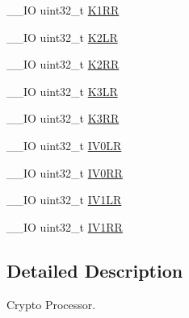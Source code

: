 \begin{DoxyCompactItemize}
\item 
\-\_\-\-\_\-\-I\-O uint32\-\_\-t \hyperlink{struct_c_r_y_p___type_def_a7554383cff84540eb260a3fdf55cb934}{K1\-R\-R}
\item 
\-\_\-\-\_\-\-I\-O uint32\-\_\-t \hyperlink{struct_c_r_y_p___type_def_a32210fb9ecbb0b4bd127e688f3f79802}{K2\-L\-R}
\item 
\-\_\-\-\_\-\-I\-O uint32\-\_\-t \hyperlink{struct_c_r_y_p___type_def_a41a0448734e8ccbdd6fba98284815c6f}{K2\-R\-R}
\item 
\-\_\-\-\_\-\-I\-O uint32\-\_\-t \hyperlink{struct_c_r_y_p___type_def_a516c328fcb53ec754384e584caf890f5}{K3\-L\-R}
\item 
\-\_\-\-\_\-\-I\-O uint32\-\_\-t \hyperlink{struct_c_r_y_p___type_def_a8fe249258f1733ec155c3893375c7a21}{K3\-R\-R}
\item 
\-\_\-\-\_\-\-I\-O uint32\-\_\-t \hyperlink{struct_c_r_y_p___type_def_ab1efba4cdf22c525fce804375961d567}{I\-V0\-L\-R}
\item 
\-\_\-\-\_\-\-I\-O uint32\-\_\-t \hyperlink{struct_c_r_y_p___type_def_aeb1990f7c28e815a4962db3a861937bb}{I\-V0\-R\-R}
\item 
\-\_\-\-\_\-\-I\-O uint32\-\_\-t \hyperlink{struct_c_r_y_p___type_def_aad2f43335b25a0065f3d327364610cbd}{I\-V1\-L\-R}
\item 
\-\_\-\-\_\-\-I\-O uint32\-\_\-t \hyperlink{struct_c_r_y_p___type_def_a38a9f05c03174023fc6ac951c04eaeff}{I\-V1\-R\-R}
\end{DoxyCompactItemize}


\subsection{Detailed Description}
Crypto Processor. 

